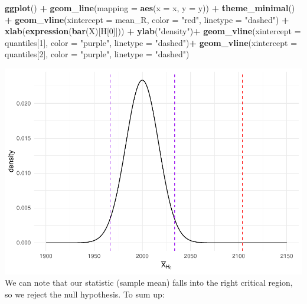 \documentclass[
]{article}
\newenvironment{Shaded}{\begin{snugshade}}{\end{snugshade}}
\newcommand{\AttributeTok}[1]{\textcolor[rgb]{0.13,0.29,0.53}{#1}}
\newcommand{\DecValTok}[1]{\textcolor[rgb]{0.00,0.00,0.81}{#1}}
\newcommand{\FunctionTok}[1]{\textcolor[rgb]{0.13,0.29,0.53}{\textbf{#1}}}
\newcommand{\NormalTok}[1]{#1}
\newcommand{\SpecialCharTok}[1]{\textcolor[rgb]{0.81,0.36,0.00}{\textbf{#1}}}
\newcommand{\StringTok}[1]{\textcolor[rgb]{0.31,0.60,0.02}{#1}}
\begin{document}
\begin{Shaded}
\begin{Highlighting}[]
\FunctionTok{ggplot}\NormalTok{() }\SpecialCharTok{+} 
   \FunctionTok{geom\_line}\NormalTok{(}\AttributeTok{mapping =} \FunctionTok{aes}\NormalTok{(}\AttributeTok{x =}\NormalTok{ x, }\AttributeTok{y =}\NormalTok{ y)) }\SpecialCharTok{+} 
   \FunctionTok{theme\_minimal}\NormalTok{() }\SpecialCharTok{+} 
   \FunctionTok{geom\_vline}\NormalTok{(}\AttributeTok{xintercept =}\NormalTok{ mean\_R, }\AttributeTok{color =} \StringTok{"red"}\NormalTok{, }\AttributeTok{linetype =} \StringTok{"dashed"}\NormalTok{)  }\SpecialCharTok{+}
    \FunctionTok{xlab}\NormalTok{(}\FunctionTok{expression}\NormalTok{(}\FunctionTok{bar}\NormalTok{(X)[H[}\DecValTok{0}\NormalTok{]])) }\SpecialCharTok{+}
   \FunctionTok{ylab}\NormalTok{(}\StringTok{"density"}\NormalTok{)}\SpecialCharTok{+} 
   \FunctionTok{geom\_vline}\NormalTok{(}\AttributeTok{xintercept =}\NormalTok{ quantiles[}\DecValTok{1}\NormalTok{], }\AttributeTok{color =} \StringTok{"purple"}\NormalTok{, }\AttributeTok{linetype =} \StringTok{"dashed"}\NormalTok{)}\SpecialCharTok{+} 
   \FunctionTok{geom\_vline}\NormalTok{(}\AttributeTok{xintercept =}\NormalTok{ quantiles[}\DecValTok{2}\NormalTok{], }\AttributeTok{color =} \StringTok{"purple"}\NormalTok{, }\AttributeTok{linetype =} \StringTok{"dashed"}\NormalTok{)}
\end{Highlighting}
\end{Shaded}

\includegraphics{Hypothesis_Testing_files/figure-latex/unnamed-chunk-6-1.pdf}
We can note that our statistic (sample mean) falls into the right
critical region, so we reject the null hypothesis. To sum up:
\end{document}

